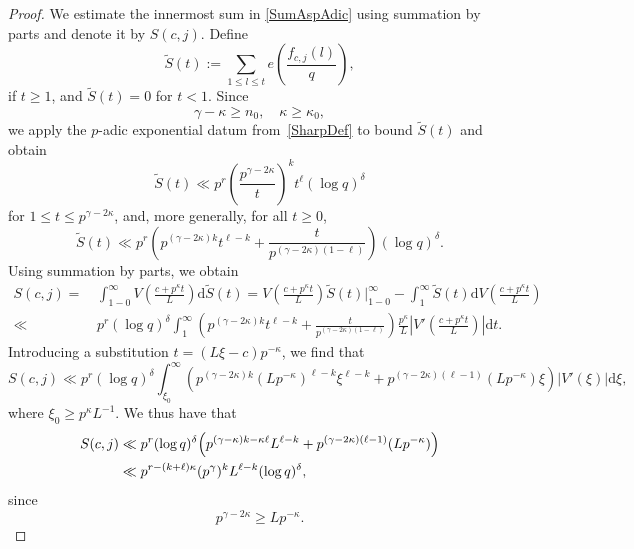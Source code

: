 \documentclass[11pt,reqno]{amsart}
\numberwithin{equation}{section}
\theoremstyle{plain}
\theoremstyle{definition}
\newcommand{\dd}{\mathrm{d}}
\begin{document}
\begin{proof}
We estimate the innermost sum in \eqref{SumAspAdic} using summation by parts and denote it by $S(c,j)$.  
Define  
\begin{equation*}
\tilde{S}(t) := \sum_{1 \le l \le t} e\left(\frac{f_{c,j}(l)}{q}\right),
\end{equation*}
if $ t \geq 1 $, and $ \tilde{S}(t) = 0 $ for $ t < 1 $. 
Since
$$ \gamma-\kappa\geqslant n_0,\quad \kappa\geqslant\kappa_0, $$
we apply the $p$-adic exponential datum from~\eqref{SharpDef} to bound $\tilde{S}(t)$ and obtain
\begin{equation}\label{St bound}
\tilde{S}(t)\ll p^r\left(\frac{p^{\gamma-2\kappa}}{t}\right)^k t^{\ell}(\log q)^{\delta}
\end{equation}
for \(1 \leq t \leq p^{\gamma-2\kappa}\), and, more generally, for all \(t \geq 0\),
\[
\tilde{S}(t) \ll p^r \left( p^{(\gamma-2\kappa)k} t^{\ell-k} + \frac{t}{p^{(\gamma-2\kappa)(1-\ell)}} \right) (\log q)^\delta.
\]
Using summation by parts, we obtain
\[
\begin{aligned}
S(c,j) = & \, \int_{1-0}^\infty V\left(\frac{c + p^\kappa t}{L}\right) \dd \tilde{S}(t) = V\left(\frac{c + p^\kappa t}{L}\right) \tilde{S}(t) 
\bigg|_{1-0}^\infty - \int_{1}^\infty \tilde{S}(t) \dd V\left(\frac{c + p^\kappa t}{L}\right) \\
\ll & \, p^r (\log q)^\delta \int_1^\infty \left( p^{(\gamma -2\kappa)k} t^{\ell-k} + \frac{t}{p^{(\gamma-2\kappa)(1-\ell)}} \right) \frac{p^{\kappa}}{L}
\left| V' \left( \frac{c+p^\kappa t}{L} \right) \right| \dd t.
\end{aligned}
\]
Introducing a substitution $t=(L\xi-c)p^{-\kappa}$, we find that
\[
S(c,j) \ll p^{r} (\log q)^{\delta} \int_{\xi_0}^{\infty} \left( p^{(\gamma-2\kappa)k}(Lp^{-\kappa})^{\ell-k} 
\xi^{\ell-k} + p^{(\gamma-2\kappa)(\ell-1)}(Lp^{-\kappa}) \xi \right)  |V'(\xi)|  \dd\xi,
\]
where $ \xi_0 \ge p^{\kappa}L^{-1} $. 
We thus have that
\[
\begin{aligned}
S(c,j) &\ll p^{r} (\log q)^\delta \Bigl( p^{(\gamma-\kappa)k-\kappa\ell} L^{\ell-k}+ p^{(\gamma-2\kappa)(\ell-1)}(Lp^{-\kappa})  \Bigr) \\
&\ll p^{r-(k+\ell)\kappa} (p^\gamma)^k  L^{\ell-k} (\log q)^{\delta},
\end{aligned}
\]
since 
\begin{equation}\label{condition}
p^{\gamma-2\kappa}\geq Lp^{-\kappa}.
\end{equation}


\end{proof}
\end{document}
